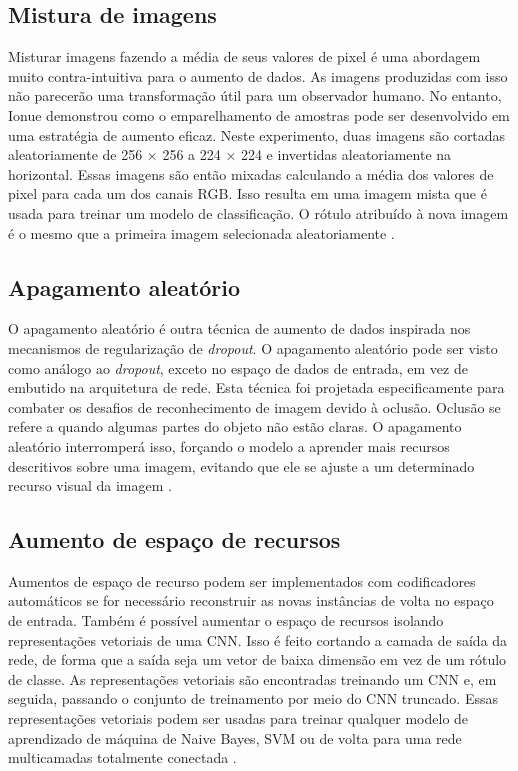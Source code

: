 \documentclass[
	12pt,				%
	oneside,			%
	a4paper,			%
	english,			%
	brazil				%
	]{abntex2ppgsi}
\begin{document}
\subsection{Mistura de imagens}

Misturar imagens fazendo a média de seus valores de pixel é uma abordagem muito contra-intuitiva para o aumento de dados. As imagens produzidas com isso não parecerão uma transformação útil para um observador humano. No entanto, Ionue demonstrou como o emparelhamento de amostras pode ser desenvolvido em uma estratégia de aumento eficaz. Neste experimento, duas imagens são cortadas aleatoriamente de 256 × 256 a 224 × 224 e invertidas aleatoriamente na horizontal. Essas imagens são então mixadas calculando a média dos valores de pixel para cada um dos canais RGB. Isso resulta em uma imagem mista que é usada para treinar um modelo de classificação. O rótulo atribuído à nova imagem é o mesmo que a primeira imagem selecionada aleatoriamente \cite{shorten2019survey}.

\subsection{Apagamento aleatório}

O apagamento aleatório é outra técnica de aumento de dados inspirada nos mecanismos de regularização de \textit{dropout}. O apagamento aleatório pode ser visto como análogo ao \textit{dropout}, exceto no espaço de dados de entrada, em vez de embutido na arquitetura de rede. Esta técnica foi projetada especificamente para combater os desafios de reconhecimento de imagem devido à oclusão. Oclusão se refere a quando algumas partes do objeto não estão claras. O apagamento aleatório interromperá isso, forçando o modelo a aprender mais recursos descritivos sobre uma imagem, evitando que ele se ajuste a um determinado recurso visual da imagem \cite{shorten2019survey}.

\subsection{Aumento de espaço de recursos}

Aumentos de espaço de recurso podem ser implementados com codificadores automáticos se for necessário reconstruir as novas instâncias de volta no espaço de entrada. Também é possível aumentar o espaço de recursos isolando representações vetoriais de uma CNN. Isso é feito cortando a camada de saída da rede, de forma que a saída seja um vetor de baixa dimensão em vez de um rótulo de classe. As representações vetoriais são encontradas treinando um CNN e, em seguida, passando o conjunto de treinamento por meio do CNN truncado. Essas representações vetoriais podem ser usadas para treinar qualquer modelo de aprendizado de máquina de Naive Bayes, SVM ou de volta para uma rede multicamadas totalmente conectada \cite{shorten2019survey}.
\end{document}
